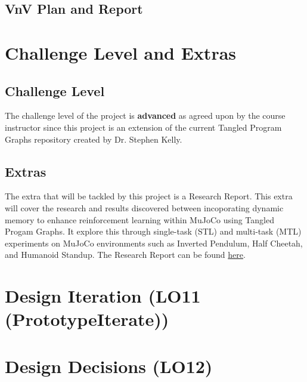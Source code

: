 \documentclass{article}
\begin{document}
\subsection{VnV Plan and Report}

\section{Challenge Level and Extras}

\subsection{Challenge Level}
The challenge level of the project is \textbf{advanced} as agreed upon by the course instructor since this project is an extension of the current Tangled Program Graphs repository created by Dr. Stephen Kelly.

\subsection{Extras}
The extra that will be tackled by this project is a Research Report. This extra will cover the research and results discovered between incoporating dynamic memory to enhance reinforcement learning within MuJoCo using Tangled Progam Graphs.
It explore this through single-task (STL) and multi-task (MTL) experiments on MuJoCo environments such as Inverted Pendulum, Half Cheetah, and Humanoid Standup.
The Research Report can be found \href{https://github.com/TPGEngine/tpg/blob/main/docs/Extras/ResearchReport(Advanced)/ResearchReport.pdf}{here}.

\section{Design Iteration (LO11 (PrototypeIterate))}



\section{Design Decisions (LO12)}
\end{document}
